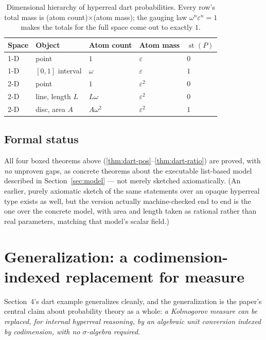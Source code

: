 \documentclass[11pt]{article}
\theoremstyle{definition}
\theoremstyle{remark}
\newcommand{\eps}{\varepsilon}
\newcommand{\st}{\operatorname{st}}
\begin{document}
\begin{table}[h]
\centering
\begin{tabular}{lllll}
\hline
Space & Object & Atom count & Atom mass & $\st(P)$\\
\hline
1-D & point & $1$ & $\eps$ & $0$ \\
1-D & $[0,1]$ interval & $\omega$ & $\eps$ & $1$ \\
2-D & point & $1$ & $\eps^2$ & $0$ \\
2-D & line, length $L$ & $L\omega$ & $\eps^2$ & $0$ \\
2-D & disc, area $A$ & $A\omega^2$ & $\eps^2$ & $1$ \\
\hline
\end{tabular}
\caption{Dimensional hierarchy of hyperreal dart probabilities. Every row's
total mass is (atom count)$\times$(atom mass); the gauging law
$\omega^n\eps^n=1$ makes the totals for the full space come out to
exactly $1$.}
\label{tab:dims}
\end{table}

\subsection{Formal status}

All four boxed theorems above (\ref{thm:dart-pos}--\ref{thm:dart-ratio})
are proved, with \emph{no} unproven gaps, as concrete theorems about the
executable list-based model described in Section~\ref{sec:model} — not
merely sketched axiomatically. (An earlier, purely axiomatic sketch of the
same statements over an opaque hyperreal type exists as well, but the
version actually machine-checked end to end is the one over the concrete
model, with area and length taken as rational rather than real
parameters, matching that model's scalar field.)

\section{Generalization: a codimension-indexed replacement for measure}\label{sec:general-prob}

Section~4's dart example generalizes cleanly, and the generalization is the
paper's central claim about probability theory as a whole: \emph{a
Kolmogorov measure can be replaced, for internal hyperreal reasoning, by an
algebraic unit conversion indexed by codimension, with no $\sigma$-algebra
required.}
\end{document}
